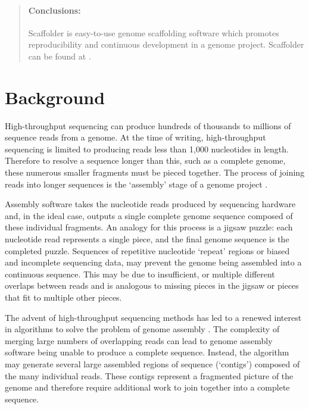 \documentclass[10pt]{bmc_article}
\newenvironment{bmcformat}{\begin{raggedright}\baselineskip20pt\sloppy\setboolean{publ}{false}}{\end{raggedright}\baselineskip20pt\sloppy}
\begin{document}
\begin{bmcformat}
\begin{abstract}
  \paragraph*{Conclusions:} Scaffolder is easy-to-use genome scaffolding
  software which promotes reproducibility and continuous development in a
  genome project. Scaffolder can be found at \scaffolder.

\end{abstract}


\clearpage

\section*{Background} %

High-throughput sequencing can produce hundreds of thousands to millions of
sequence reads from a genome. At the time of writing, high-throughput
sequencing is limited to producing reads less than 1,000 nucleotides in
length. Therefore to resolve a sequence longer than this, such as a complete
genome, these numerous smaller fragments must be pieced together. The process
of joining reads into longer sequences is the `assembly' stage of a genome
project \cite{miller2010}. \pb

Assembly software takes the nucleotide reads produced by sequencing hardware
and, in the ideal case, outputs a single complete genome sequence composed of
these individual fragments. An analogy for this process is a jigsaw puzzle:
each nucleotide read represents a single piece, and the final genome sequence
is the completed puzzle. Sequences of repetitive nucleotide `repeat' regions
or biased and incomplete sequencing data, may prevent the genome being
assembled into a continuous sequence. This may be due to insufficient, or
multiple different overlaps between reads and is analogous to missing pieces
in the jigsaw or pieces that fit to multiple other pieces. \pb

The advent of high-throughput sequencing methods has led to a renewed interest
in algorithms to solve the problem of genome assembly \cite{pop2008,pop2009}.
The complexity of merging large numbers of overlapping reads can lead to
genome assembly software being unable to produce a complete sequence. Instead,
the algorithm may generate several large assembled regions of sequence
(`contigs') composed of the many individual reads. These contigs represent a
fragmented picture of the genome and therefore require additional work to join
together into a complete sequence. \pb


\end{bmcformat}
\end{document}
